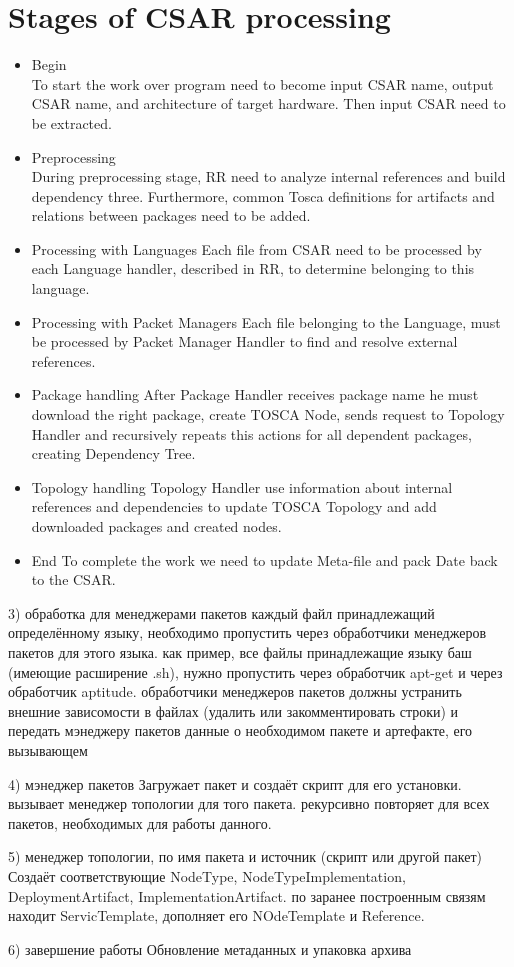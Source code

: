 \section*{Stages of CSAR processing}
\begin{itemize}  
	\item Begin  \\
	To start the work over program need to become input CSAR name, output CSAR name, and architecture of target hardware. 
	Then input CSAR need to be extracted.
	\item Preprocessing\\
	During preprocessing stage, RR need to analyze internal references and build dependency three.
	Furthermore, common Tosca definitions for artifacts and  relations between packages need to be added.
	\item Processing with Languages
	Each file from CSAR need to be processed by each Language handler, described in RR, to determine belonging to this language.
	\item Processing with Packet Managers
	Each file belonging to the Language, must be processed by Packet Manager Handler to find and resolve external references.
	\item Package handling
	After Package Handler receives package name he must download the right package, create TOSCA Node, sends request to Topology Handler  and recursively repeats this actions for all dependent packages, creating Dependency Tree.
	\item Topology handling
	Topology Handler use information about internal references and dependencies to update TOSCA Topology and add downloaded packages and created nodes. 
	\item End
	To complete the work we need to update Meta-file and pack Date back to the CSAR.
	
\end{itemize}
3) обработка для менеджерами пакетов
каждый файл принадлежащий определённому языку, необходимо пропустить через обработчики менеджеров пакетов для этого языка. 
как пример, все файлы принадлежащие языку баш (имеющие расширение .sh), нужно пропустить через обработчик apt-get и через обработчик aptitude.
обработчики менеджеров пакетов должны устранить внешние зависомости в файлах (удалить или закомментировать строки) и передать мэнеджеру пакетов данные о необходимом пакете и артефакте, его вызывающем

4) мэнеджер пакетов
Загружает пакет и создаёт скрипт для его установки. вызывает менеджер топологии для того пакета. рекурсивно повторяет для всех пакетов, необходимых для работы данного. 

5) менеджер топологии, по имя пакета и источник (скрипт или другой пакет) 
Создаёт соответствующие NodeType, NodeTypeImplementation, DeploymentArtifact, ImplementationArtifact. 
по заранее построенным связям находит ServicTemplate, дополняет его NOdeTemplate и Reference. 

6) завершение работы
Обновление метаданных и упаковка архива
	
\fi

